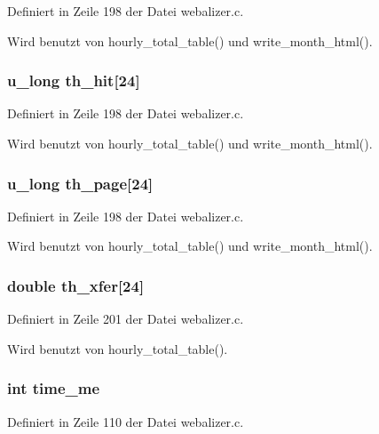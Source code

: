 Definiert in Zeile 198 der Datei webalizer.c.

Wird benutzt von hourly\_\-total\_\-table() und write\_\-month\_\-html().
\subsubsection{\setlength{\rightskip}{0pt plus 5cm}u\_\-long {\bf th\_\-hit}[24]}\label{webalizer_8h_2c634f4ff63cf16a5bb219632d9da1f5}




Definiert in Zeile 198 der Datei webalizer.c.

Wird benutzt von hourly\_\-total\_\-table() und write\_\-month\_\-html().
\subsubsection{\setlength{\rightskip}{0pt plus 5cm}u\_\-long {\bf th\_\-page}[24]}\label{webalizer_8h_cdb9ccdbdd487d188cd174056a7dcd80}




Definiert in Zeile 198 der Datei webalizer.c.

Wird benutzt von hourly\_\-total\_\-table() und write\_\-month\_\-html().
\subsubsection{\setlength{\rightskip}{0pt plus 5cm}double {\bf th\_\-xfer}[24]}\label{webalizer_8h_a063714cc339793854ef49bb72c4382b}




Definiert in Zeile 201 der Datei webalizer.c.

Wird benutzt von hourly\_\-total\_\-table().
\subsubsection{\setlength{\rightskip}{0pt plus 5cm}int {\bf time\_\-me}}\label{webalizer_8h_445501b8b84e1293820c0142acd34113}




Definiert in Zeile 110 der Datei webalizer.c.

